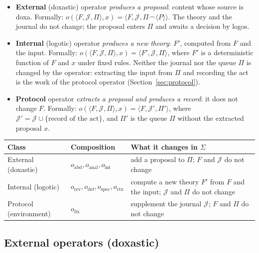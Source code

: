 \documentclass[12pt,a4paper]{article}
\begin{document}
\begin{itemize}
	\item \textbf{External} (doxastic) operator \emph{produces a proposal}:
	      content whose source is doxa. Formally:
	      $o(\langle F, \mathcal{J}, \Pi \rangle, x)
	      = \langle F, \mathcal{J}, \Pi \frown \langle P \rangle \rangle$.
	      The theory and the journal do not change; the proposal enters
	      $\Pi$ and awaits a decision by logos.
	\item \textbf{Internal} (logotic) operator \emph{produces a new theory}:
	      $F'$, computed from $F$ and the input. Formally:
	      $o(\langle F, \mathcal{J}, \Pi \rangle, x)
	      = \langle F', \mathcal{J}, \Pi \rangle$,
	      where $F'$ is a deterministic function of $F$ and $x$ under fixed
	      rules. Neither the journal nor the queue $\Pi$ is changed by the
	      operator: extracting the input from $\Pi$ and recording the act is
	      the work of the protocol operator (Section~\ref{sec:protocol}).
	\item \textbf{Protocol} operator \emph{extracts a proposal and produces a
	      record}: it does not change $F$. Formally:
	      $o(\langle F, \mathcal{J}, \Pi \rangle, x)
	      = \langle F, \mathcal{J}', \Pi' \rangle$,
	      where $\mathcal{J}' = \mathcal{J} \cup \{\text{record of the act}\}$,
	      and $\Pi'$ is the queue $\Pi$ without the extracted proposal $x$.
\end{itemize}

\vspace{1em}
\noindent
\begin{tabularx}{\textwidth}{>{\raggedright\arraybackslash}p{2.9cm}>{\raggedright\arraybackslash}X>{\raggedright\arraybackslash}X}
\hline
\textbf{Class} & \textbf{Composition} & \textbf{What it changes in $\Sigma$} \\
\hline
External (doxastic) & $o_{\text{abd}}, o_{\text{anal}}, o_{\text{int}}$ & add a proposal to $\Pi$; $F$ and $\mathcal{J}$ do not change \\
Internal (logotic) & $o_{\text{rev}}, o_{\text{def}}, o_{\text{spec}}, o_{\text{ctx}}$ & compute a new theory $F'$ from $F$ and the input; $\mathcal{J}$ and $\Pi$ do not change \\
Protocol (environment) & $o_{\text{fix}}$ & supplement the journal $\mathcal{J}$; $F$ and $\Pi$ do not change \\
\hline
\end{tabularx}

\subsection{External operators (doxastic)}
\label{sec:external}
\end{document}
